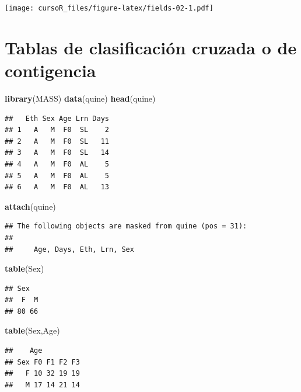 \documentclass[]{book}
\newenvironment{Shaded}{\begin{snugshade}}{\end{snugshade}}
\newcommand{\KeywordTok}[1]{\textcolor[rgb]{0.13,0.29,0.53}{\textbf{#1}}}
\newcommand{\NormalTok}[1]{#1}
\begin{document}
\texttt{[image: cursoR\_files/figure-latex/fields-02-1.pdf]}

\section{Tablas de clasificación cruzada o de
contigencia}\label{tablas-de-clasificaciuxf3n-cruzada-o-de-contigencia}

\begin{Shaded}
\begin{Highlighting}[]
\KeywordTok{library}\NormalTok{(MASS)}
\KeywordTok{data}\NormalTok{(quine)}
\KeywordTok{head}\NormalTok{(quine)}
\end{Highlighting}
\end{Shaded}

\begin{verbatim}
##   Eth Sex Age Lrn Days
## 1   A   M  F0  SL    2
## 2   A   M  F0  SL   11
## 3   A   M  F0  SL   14
## 4   A   M  F0  AL    5
## 5   A   M  F0  AL    5
## 6   A   M  F0  AL   13
\end{verbatim}

\begin{Shaded}
\begin{Highlighting}[]
\KeywordTok{attach}\NormalTok{(quine)}
\end{Highlighting}
\end{Shaded}

\begin{verbatim}
## The following objects are masked from quine (pos = 31):
## 
##     Age, Days, Eth, Lrn, Sex
\end{verbatim}

\begin{Shaded}
\begin{Highlighting}[]
\KeywordTok{table}\NormalTok{(Sex)}
\end{Highlighting}
\end{Shaded}

\begin{verbatim}
## Sex
##  F  M 
## 80 66
\end{verbatim}

\begin{Shaded}
\begin{Highlighting}[]
\KeywordTok{table}\NormalTok{(Sex,Age)}
\end{Highlighting}
\end{Shaded}

\begin{verbatim}
##    Age
## Sex F0 F1 F2 F3
##   F 10 32 19 19
##   M 17 14 21 14
\end{verbatim}
\end{document}
